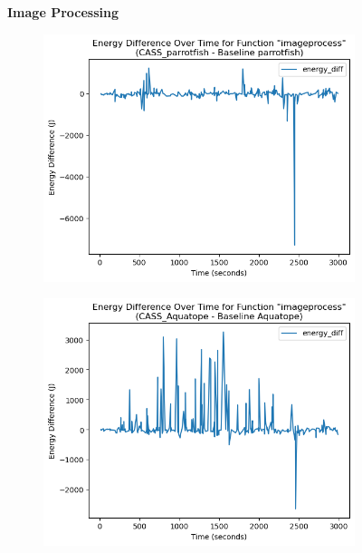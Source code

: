 \documentclass[times, 10pt,twocolumn]{article}
\begin{document}
\begin{figure}[ht]
   \centering
   \newpage
   \newpage
   \textbf{Image Processing}\par\medskip
   \begin{subfigure}[b]{0.4\textwidth}
      \includegraphics[width=\textwidth]{imgs/final_experiment_plots/energy_comparison/parrotfish/imageprocess.png}
     \caption{}
     \label{fig:image_energy_diff_parrotfish}
   \end{subfigure}
   \hfill
   \begin{subfigure}[b]{0.4\textwidth}
      \includegraphics[width=\textwidth]{imgs/final_experiment_plots/energy_comparison/aquatope/imageprocess.png}
     \caption{}
     \label{fig:image_energy_diff_aquatope}
   \end{subfigure}


\end{figure}
\end{document}
